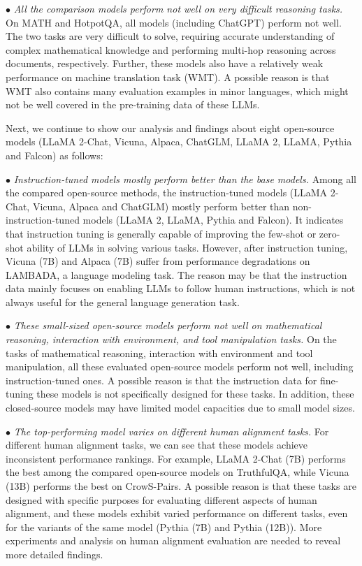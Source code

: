 %

$\bullet$ 
\emph{All the comparison models perform not well on very difficult reasoning tasks.} 
On MATH and HotpotQA, all models (including ChatGPT) perform not well. The two tasks are very difficult to solve, requiring accurate understanding of complex mathematical knowledge and performing multi-hop reasoning across documents, respectively.
{Further, these models also have a relatively weak performance on machine translation task (WMT). 
A possible reason is that  WMT also contains many  evaluation examples in minor languages, which might not be well covered in the pre-training data of these LLMs. 
}


Next, we continue to show our analysis and findings about eight open-source models (\ie LLaMA 2-Chat, Vicuna, Alpaca, ChatGLM, LLaMA 2, LLaMA, Pythia and Falcon) as follows: 

$\bullet$ \emph{Instruction-tuned models mostly perform better than the base models.} 
{Among all the compared open-source methods, the instruction-tuned models (\ie LLaMA 2-Chat, Vicuna, Alpaca and ChatGLM) mostly perform better than  non-instruction-tuned models (\ie LLaMA 2, LLaMA, Pythia and Falcon).}
It indicates that instruction tuning is generally capable of improving  the few-shot or zero-shot ability of LLMs in solving various tasks. 
However, after instruction tuning, Vicuna (7B) and Alpaca (7B) suffer from performance degradations on LAMBADA, a language modeling task. 
{The reason may be that the instruction data mainly focuses on enabling LLMs to follow human instructions, which is not always useful  for the general language generation task. }

 
$\bullet$ \emph{These small-sized open-source models perform not well on {mathematical reasoning, interaction with environment, and tool manipulation tasks.}} 
On the tasks of mathematical reasoning, interaction with environment and tool manipulation, all these evaluated open-source models perform not well, including instruction-tuned ones. %
A possible reason is that the instruction data for fine-tuning these models is not specifically designed for these tasks. In addition, these closed-source models may have limited model capacities due to small model sizes.     

$\bullet$ \emph{The top-performing model varies on different human alignment tasks.}
For different human alignment tasks, we can see that these models achieve inconsistent performance rankings.  
For example, LLaMA 2-Chat (7B) performs the best among the compared open-source models on TruthfulQA, while Vicuna (13B) performs the best on CrowS-Pairs. A possible reason is that these tasks are designed with specific purposes for evaluating different aspects of human alignment, and these models exhibit varied performance on different tasks, even for the variants of the same model (\eg Pythia (7B) and Pythia (12B)). More experiments and analysis on human alignment evaluation are needed to reveal more detailed findings.  


